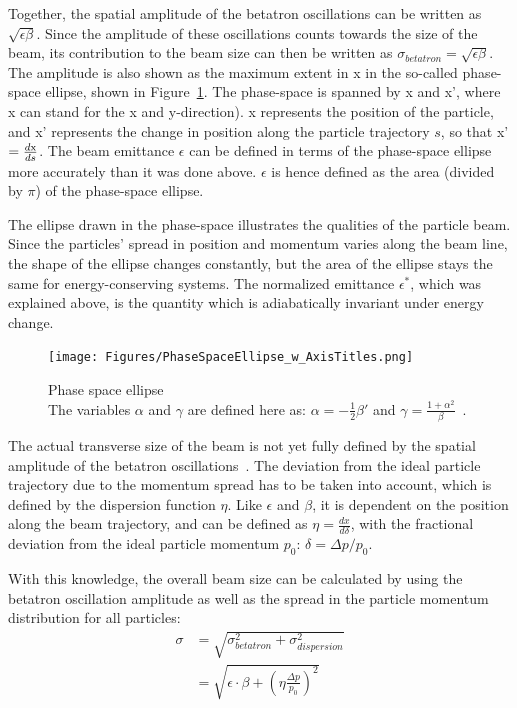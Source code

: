 Together, the spatial amplitude of the betatron oscillations can be written as $\sqrt{\epsilon\beta}$.
Since the amplitude of these oscillations counts towards the size of the beam, its contribution to the beam size can then be written as $\sigma_{betatron} = \sqrt{\epsilon\beta}$.
The amplitude is also shown as the maximum extent in x in the so-called phase-space ellipse, shown in Figure~\ref{fig:PhaseSpaceEllipse}.
The phase-space is spanned by x and x', where x can stand for the x and y-direction). 
x represents the position of the particle, and x' represents the change in position along the particle trajectory $s$, so that x'$=\frac{d\rm{x}}{ds}$.
The beam emittance $\epsilon$ can be defined in terms of the phase-space ellipse more accurately than it was done above.
$\epsilon$ is hence defined as the area (divided by $\pi$) of the phase-space ellipse.

The ellipse drawn in the phase-space illustrates the qualities of the particle beam.
Since the particles' spread in position and momentum varies along the beam line, the shape of the ellipse changes constantly, but the area of the ellipse stays the same for energy-conserving systems.
The normalized emittance $\epsilon^*$, which was explained above, is the quantity which is adiabatically invariant under energy change.
\begin{figure}[h]
\centering
\texttt{[image: Figures/PhaseSpaceEllipse\_w\_AxisTitles.png]}
\caption[Phase space ellipse]{Phase space ellipse~\cite[based on p. 158]{Wiedemann}
\\The variables $\alpha$ and $\gamma$ are defined here as: $\alpha = -\frac12\beta'$ and $\gamma = \frac{1+\alpha^2}{\beta}$~\cite[cf. p. 283ff]{Wangler}.}
\label{fig:PhaseSpaceEllipse}
\end{figure}

The actual transverse size of the beam is not yet fully defined by the spatial amplitude of the betatron oscillations~\cite[cf. p. 108ff]{Conte}.
The deviation from the ideal particle trajectory due to the momentum spread has to be taken into account, which is defined by the dispersion function $\eta$.
Like $\epsilon$ and $\beta$, it is dependent on the position along the beam trajectory, and can be defined as $\eta = \frac{dx}{d\delta}$, with the fractional deviation from the ideal particle momentum $p_0$: $\delta = \Delta p/p_0$.

With this knowledge, the overall beam size can be calculated by using the betatron oscillation amplitude as well as the spread in the particle momentum distribution for all particles:
\begin{align}
 \sigma&=\sqrt{\sigma^2_{betatron}+\sigma^2_{dispersion}}\\
 &=\sqrt{\epsilon\cdot\beta+\left(\eta\frac{\Delta p}{p_0}\right)^2}
\end{align}

